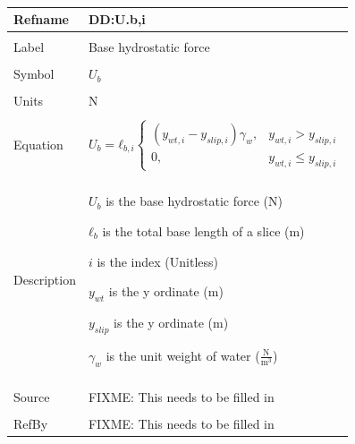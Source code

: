 \documentclass[12pt]{article}
\begin{document}
~\newline
\noindent \begin{minipage}{\textwidth}
\begin{tabular}{p{} p{}}
\toprule \textbf{Refname} & \textbf{DD:U.b,i}
\label{DD:U.b,i}
\\ \midrule \\
Label & Base hydrostatic force
\\ \midrule \\
Symbol & ${U_{b}}$
\\ \midrule \\
Units & N
\\ \midrule \\
Equation & \begin{dmath}
           {U_{b}}={ℓ_{b,i}} \begin{cases}
\left({y_{wt,i}}-{y_{slip,i}}\right) {γ_{w}}, & {y_{wt,i}}>{y_{slip,i}}\\
0, & {y_{wt,i}}\leq{}{y_{slip,i}}
\end{cases}
           \end{dmath}
\\ \midrule \\
Description & \begin{symbDescription}
              \item{${U_{b}}$ is the base hydrostatic force (N)}
              \item{${ℓ_{b}}$ is the total base length of a slice (m)}
              \item{$i$ is the index (Unitless)}
              \item{${y_{wt}}$ is the y ordinate (m)}
              \item{${y_{slip}}$ is the y ordinate (m)}
              \item{${γ_{w}}$ is the unit weight of water ($\frac{\text{N}}{\text{m}^{3}}$)}
              \end{symbDescription}
\\ \midrule \\
Source & FIXME: This needs to be filled in
\\ \midrule \\
RefBy & FIXME: This needs to be filled in
\\ \bottomrule \end{tabular}
\end{minipage}\\
~\newline
\end{document}
